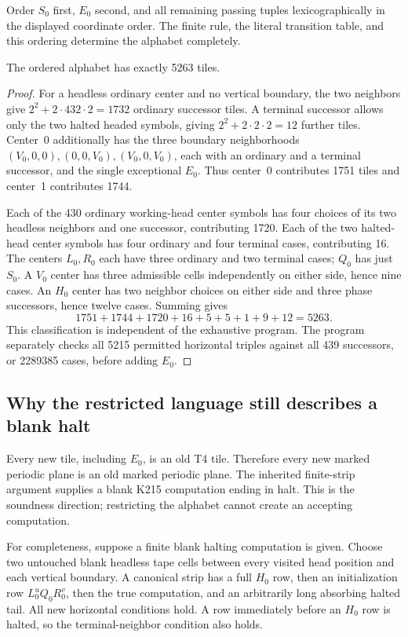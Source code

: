 Order $S_0$ first, $E_0$ second, and all remaining passing tuples
lexicographically in the displayed coordinate order.  The finite rule,
the literal transition table, and this ordering determine the alphabet
completely.

\begin{proposition}
The ordered alphabet has exactly 5263 tiles.
\end{proposition}
\begin{proof}
For a headless ordinary center and no vertical boundary, the two
neighbors give
$2^2+2\cdot432\cdot2=1732$ ordinary successor tiles.  A terminal
successor allows only the two halted headed symbols, giving
$2^2+2\cdot2\cdot2=12$ further tiles.  Center~0 additionally has the
three boundary neighborhoods $(V_0,0,0),(0,0,V_0),(V_0,0,V_0)$, each
with an ordinary and a terminal successor, and the single exceptional
$E_0$.  Thus center~0 contributes 1751 tiles and center~1 contributes
1744.

Each of the 430 ordinary working-head center symbols has four choices
of its two headless neighbors and one successor, contributing 1720.
Each of the two halted-head center symbols has four ordinary and four
terminal cases, contributing 16.  The centers $L_0,R_0$ each have three
ordinary and two terminal cases; $Q_0$ has just $S_0$.  A $V_0$ center
has three admissible cells independently on either side, hence nine
cases.  An $H_0$ center has two neighbor choices on either side and
three phase successors, hence twelve cases.  Summing gives
\[
 1751+1744+1720+16+5+5+1+9+12=5263.
\]
This classification is independent of the exhaustive program.  The
program separately checks all 5215 permitted horizontal triples
against all 439 successors, or 2289385 cases, before adding $E_0$.
\end{proof}

\subsection{Why the restricted language still describes a blank halt}

Every new tile, including $E_0$, is an old T4 tile.  Therefore every new
marked periodic plane is an old marked periodic plane.  The inherited
finite-strip argument supplies a blank K215 computation ending in halt.
This is the soundness direction; restricting the alphabet cannot create
an accepting computation.

For completeness, suppose a finite blank halting computation is given.
Choose two untouched blank headless tape cells between every visited
head position and each vertical boundary.  A canonical strip has a full
$H_0$ row, then an initialization row $L_0^uQ_0R_0^v$, then the true
computation, and an arbitrarily long absorbing halted tail.  All new
horizontal conditions hold.  A row immediately before an $H_0$ row is
halted, so the terminal-neighbor condition also holds.

